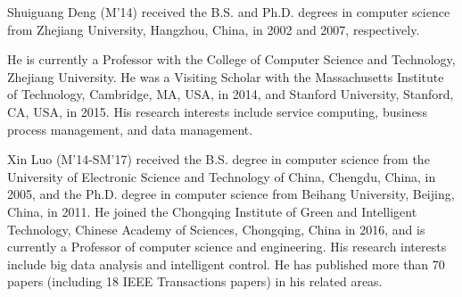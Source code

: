 \documentclass[journal]{IEEEtran}
\begin{document}
\begin{IEEEbiography}{Shuiguang Deng}
(M'14) received the B.S. and Ph.D. degrees in computer science from Zhejiang University, Hangzhou, China, in 2002 and 2007, respectively.

He is currently a Professor with the College of Computer Science and Technology, Zhejiang University. He was a Visiting Scholar with the Massachusetts Institute of Technology, Cambridge, MA, USA, in 2014, and Stanford University, Stanford, CA, USA, in 2015. His research interests include service computing, business process management, and data management.
\end{IEEEbiography}

\enlargethispage{-1.5in}

\begin{IEEEbiography}{Xin Luo}
(M'14-SM'17) received the B.S. degree in computer science from the University of Electronic
Science and Technology of China, Chengdu, China, in 2005, and the Ph.D. degree in computer science from Beihang University, Beijing, China, in 2011. He joined the Chongqing Institute of Green and Intelligent Technology, Chinese Academy of Sciences, Chongqing, China in 2016, and is currently a Professor of computer science and engineering. His research interests include big data analysis and intelligent control. He has published more than 70 papers (including 18 IEEE Transactions papers) in his related areas.
\end{IEEEbiography}
\end{document}
